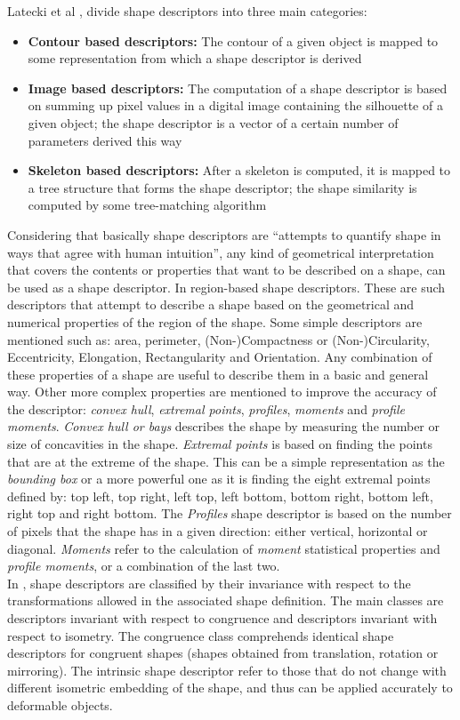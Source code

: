 Latecki et al \cite{shapenonrigid}, divide shape descriptors into three
main categories: 
\begin{itemize}
\item \textbf{Contour based descriptors: }The contour of a given object is 
mapped to some representation from which a shape descriptor is derived
\item \textbf{Image based descriptors: }The computation of a shape descriptor
is based on summing up pixel values in a digital image containing the silhouette
of a given object; the shape descriptor is a vector of a certain number of
parameters derived this way
\item \textbf{Skeleton based descriptors: }After a skeleton is computed, it is
mapped to a tree structure that forms the shape descriptor; the shape similarity
is computed by some tree-matching algorithm 
\end{itemize}

Considering that basically shape descriptors are ``attempts to quantify shape in 
ways that agree with human intuition''\cite[p.1]{desclecture}, any kind of 
geometrical interpretation that covers the contents or properties that want 
to be described on a shape, can be used as a shape descriptor.
In \cite{desclecture} region-based shape descriptors. These are such descriptors
that attempt to describe a shape based on the geometrical and numerical properties
of the region of the shape. Some simple descriptors are mentioned such as:
area, perimeter, (Non-)Compactness or (Non-)Circularity, Eccentricity, Elongation,
Rectangularity and Orientation. Any combination of these properties of a shape are
useful to describe them in a basic and general way.
Other more complex properties are mentioned to improve the accuracy of the 
descriptor: \emph{convex hull}, \emph{extremal points}, \emph{profiles}, 
\emph{ moments} and \emph{profile moments}. \emph{Convex hull or bays} 
describes the shape by measuring the number or size of concavities in the 
shape. \emph{Extremal points} is based on finding the points that
are at the extreme of the shape. This can be a simple representation as the 
\emph{bounding box} or a more powerful one as it is finding the eight extremal
points defined by: top left, top right, left top, left bottom, bottom right,
bottom left, right top and right bottom. The \emph{Profiles} shape descriptor 
is based on the number of pixels that the shape has in a given direction:
 either vertical, horizontal or diagonal. \emph{Moments} refer to the
 calculation of \emph{moment} statistical properties and 
\emph{profile moments}, or a combination of the last two.\\
In \cite{web:wikishape}, shape descriptors are classified by their
invariance with respect to the transformations allowed in the associated
shape definition. The main classes are descriptors invariant with respect 
to congruence and descriptors invariant with respect to isometry. 
The congruence class
comprehends identical shape descriptors for congruent shapes 
(shapes obtained from
translation, rotation or mirroring). The intrinsic shape descriptor refer
to those that do not change with different isometric embedding of the shape,
and thus can be applied accurately to deformable objects.

